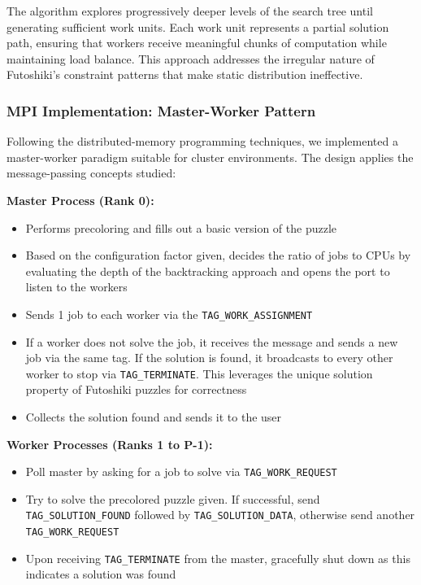 The algorithm explores progressively deeper levels of the search tree until generating sufficient work units. Each work unit represents a partial solution path, ensuring that workers receive meaningful chunks of computation while maintaining load balance. This approach addresses the irregular nature of Futoshiki's constraint patterns that make static distribution ineffective.

\subsubsection{MPI Implementation: Master-Worker Pattern}
\label{subsubsec:mpi_implementation}
Following the distributed-memory programming techniques, we implemented a master-worker paradigm suitable for cluster environments. The design applies the message-passing concepts studied:
\begin{enumerate}
\textbf{Master Process (Rank 0):}
\begin{itemize}
    \item Performs precoloring and fills out a basic version of the puzzle
    \item Based on the configuration factor given, decides the ratio of jobs to CPUs by evaluating the depth of the backtracking approach and opens the port to listen to the workers
    \item Sends 1 job to each worker via the \texttt{TAG\_WORK\_ASSIGNMENT}
    \item If a worker does not solve the job, it receives the message and sends a new job via the same tag. If the solution is found, it broadcasts to every other worker to stop via \texttt{TAG\_TERMINATE}. This leverages the unique solution property of Futoshiki puzzles for correctness
    \item Collects the solution found and sends it to the user
\end{itemize}

\textbf{Worker Processes (Ranks 1 to P-1):}
\begin{itemize}
    \item Poll master by asking for a job to solve via \texttt{TAG\_WORK\_REQUEST}
    \item Try to solve the precolored puzzle given. If successful, send \texttt{TAG\_SOLUTION\_FOUND} followed by \texttt{TAG\_SOLUTION\_DATA}, otherwise send another \texttt{TAG\_WORK\_REQUEST}
    \item Upon receiving \texttt{TAG\_TERMINATE} from the master, gracefully shut down as this indicates a solution was found
\end{itemize}


\end{enumerate}
